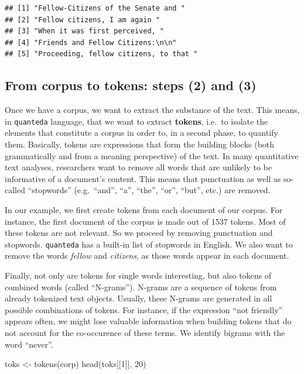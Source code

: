 \documentclass[
  12pt,
]{style/krantz}
\newenvironment{Shaded}{\begin{snugshade}}{\end{snugshade}}
\newcommand{\DecValTok}[1]{\textcolor[rgb]{0.00,0.00,0.81}{#1}}
\newcommand{\FunctionTok}[1]{\textcolor[rgb]{0.00,0.00,0.00}{#1}}
\newcommand{\NormalTok}[1]{#1}
\newcommand{\OtherTok}[1]{\textcolor[rgb]{0.56,0.35,0.01}{#1}}
\begin{document}
\begin{verbatim}
## [1] "Fellow-Citizens of the Senate and "   
## [2] "Fellow citizens, I am again "         
## [3] "When it was first perceived, "        
## [4] "Friends and Fellow Citizens:\n\n"     
## [5] "Proceeding, fellow citizens, to that "
\end{verbatim}

\hfill\break

\hypertarget{from-corpus-to-tokens-steps-2-and-3}{%
\subsection{From corpus to tokens: steps (2) and (3)}\label{from-corpus-to-tokens-steps-2-and-3}}

Once we have a corpus, we want to extract the substance of the text. This means, in \texttt{quanteda} language, that we want to extract \textbf{tokens}, i.e.~to isolate the elements that constitute a corpus in order to, in a second phase, to quantify them. Basically, tokens are expressions that form the building blocks (both grammatically and from a meaning perspective) of the text. In many quantitative text analyses, researchers want to remove all words that are unlikely to be informative of a document's content. This means that punctuation as well as so-called ``stopwords'' (e.g.~``and'', ``a'', ``the'', ``or'', ``but'', etc.) are removed.

In our example, we first create tokens from each document of our corpus. For instance, the first document of the corpus is made out of 1537 tokens. Most of these tokens are not relevant. So we proceed by removing punctuation and stopwords. \texttt{quanteda} has a built-in list of stopwords in English. We also want to remove the words \emph{fellow} and \emph{citizens}, as those words appear in each document.

Finally, not only are tokens for single words interesting, but also tokens of combined words (called ``N-grams''). N-grams are a sequence of tokens from already tokenized text objects. Usually, these N-grams are generated in all possible combinations of tokens. For instance, if the expression ``not friendly'' appears often, we might lose valuable information when building tokens that do not account for the co-occurence of these terms. We identify bigrams with the word ``never''.

\begin{Shaded}
\begin{Highlighting}[]
\NormalTok{toks }\OtherTok{\textless{}{-}} \FunctionTok{tokens}\NormalTok{(corp)}
\FunctionTok{head}\NormalTok{(toks[[}\DecValTok{1}\NormalTok{]], }\DecValTok{20}\NormalTok{)}
\end{Highlighting}
\end{Shaded}
\end{document}
